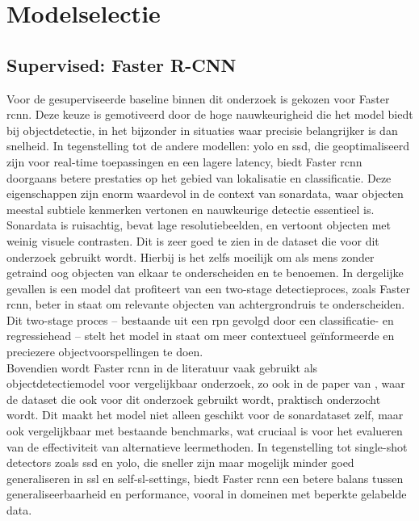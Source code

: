 \section{Modelselectie}
\label{sec:modelselectie}

\subsection{Supervised: Faster R-CNN}

Voor de gesuperviseerde baseline binnen dit onderzoek is gekozen voor Faster \gls{rcnn}. Deze keuze is gemotiveerd door de hoge nauwkeurigheid die het model biedt bij objectdetectie, in het bijzonder in situaties waar precisie belangrijker is dan snelheid. In tegenstelling tot de andere modellen: \gls{yolo} en \gls{ssd}, die geoptimaliseerd zijn voor real-time toepassingen en een lagere latency, biedt Faster \gls{rcnn} doorgaans betere prestaties op het gebied van lokalisatie en classificatie. Deze eigenschappen zijn enorm waardevol in de context van sonardata, waar objecten meestal subtiele kenmerken vertonen en nauwkeurige detectie essentieel is. \\

Sonardata is ruisachtig, bevat lage resolutiebeelden, en vertoont objecten met weinig visuele contrasten. Dit is zeer goed te zien in de dataset die voor dit onderzoek gebruikt wordt. Hierbij is het zelfs moeilijk om als mens zonder getraind oog objecten van elkaar te onderscheiden en te benoemen. In dergelijke gevallen is een model dat profiteert van een two-stage detectieproces, zoals Faster \gls{rcnn}, beter in staat om relevante objecten van achtergrondruis te onderscheiden. Dit two-stage proces -- bestaande uit een \gls{rpn} gevolgd door een classificatie- en regressiehead -- stelt het model in staat om meer contextueel geïnformeerde en preciezere objectvoorspellingen te doen. \\

Bovendien wordt Faster \gls{rcnn} in de literatuur vaak gebruikt als objectdetectiemodel voor vergelijkbaar onderzoek, zo ook in de paper van \textcite{Xie_2022}, waar de dataset die ook voor dit onderzoek gebruikt wordt, praktisch onderzocht wordt. Dit maakt het model niet alleen geschikt voor de sonardataset zelf, maar ook vergelijkbaar met bestaande benchmarks, wat cruciaal is voor het evalueren van de effectiviteit van alternatieve leermethoden. In tegenstelling tot single-shot detectors zoals \gls{ssd} en \gls{yolo}, die sneller zijn maar mogelijk minder goed generaliseren in \gls{ssl} en \gls{self-sl}-settings, biedt Faster \gls{rcnn} een betere balans tussen generaliseerbaarheid en performance, vooral in domeinen met beperkte gelabelde data. \\

